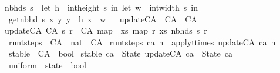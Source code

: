 \begin{isabellebody}
{\isachardoublequoteopen}nbhds\ s\ {\isacharequal}\ {\isacharparenleft}let\ h\ {\isacharequal}\ {\isacharparenleft}int{\isacharunderscore}height\ s{\isacharparenright}{\isacharminus}{}\ in\ {\isacharparenleft}let\ w\ {\isacharequal}\ {\isacharparenleft}int{\isacharunderscore}width\ s{\isacharparenright}{\isacharminus}{}\ in\isanewline
\ {\isacharbrackleft}{\isacharbrackleft}get{\isacharunderscore}nbhd\ s\ x\ y{\isachardot}\ y\ {\isasymleftarrow}\ {\isacharbrackleft}{}{\isachardot}{\isachardot}h{\isacharbrackright}{\isacharbrackright}{\isachardot}\ x\ {\isasymleftarrow}\ {\isacharbrackleft}{}{\isachardot}{\isachardot}w{\isacharbrackright}{\isacharbrackright}{\isacharparenright}{\isacharparenright}{\isachardoublequoteclose}\isanewline
\isanewline
\ \isanewline
{}\isamarkupfalse%
\ update{\isacharunderscore}CA\ {\isacharcolon}{\isacharcolon}\ {\isachardoublequoteopen}CA\ {\isasymRightarrow}\ CA{\isachardoublequoteclose}\ \isanewline
{\isachardoublequoteopen}update{\isacharunderscore}CA\ {\isacharparenleft}CA\ s\ r{\isacharparenright}\ {\isacharequal}\ CA\ {\isacharparenleft}map\ {\isacharparenleft}{\isasymlambda}\ xs{\isachardot}\ map\ r\ xs{\isacharparenright}\ {\isacharparenleft}nbhds\ s{\isacharparenright}{\isacharparenright}\ r{\isachardoublequoteclose}\isanewline
\isanewline
{}\isamarkupfalse%
\ run{\isacharunderscore}t{\isacharunderscore}steps\ {\isacharcolon}{\isacharcolon}\ {\isachardoublequoteopen}CA\ {\isasymRightarrow}\ nat\ {\isasymRightarrow}\ CA{\isachardoublequoteclose}\ \isanewline
{\isachardoublequoteopen}run{\isacharunderscore}t{\isacharunderscore}steps\ ca\ n\ {\isacharequal}\ apply{\isacharunderscore}t{\isacharunderscore}times\ update{\isacharunderscore}CA\ ca\ n{\isachardoublequoteclose}%
\isadelimdocument
%
\endisadelimdocument
%
\isatagdocument
%
\isamarkuptrue%
%
\endisatagdocument
{\isafolddocument}%
%
\isadelimdocument
%
\endisadelimdocument
{}\isamarkupfalse%
\ stable\ {\isacharcolon}{\isacharcolon}\ {\isachardoublequoteopen}CA\ {\isasymRightarrow}\ bool{\isachardoublequoteclose}\ \isanewline
{\isachardoublequoteopen}stable\ ca\ {\isasymequiv}\ State\ {\isacharparenleft}update{\isacharunderscore}CA\ ca{\isacharparenright}\ {\isacharequal}\ State\ ca{\isachardoublequoteclose}\isanewline
\isanewline
{}\isamarkupfalse%
\ uniform\ {\isacharcolon}{\isacharcolon}\ {\isachardoublequoteopen}state\ {\isasymRightarrow}\ bool{\isachardoublequoteclose}\ \isanewline

\end{isabellebody}
